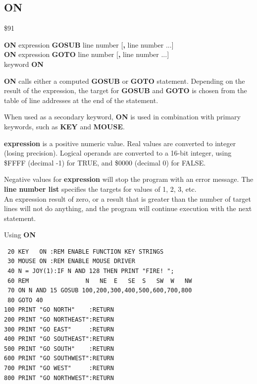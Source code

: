 \subsection{ON}
\begin{description}[leftmargin=2cm,style=nextline]
\item [Token:] \$91
\item [Format:] {\bf ON} expression {\bf GOSUB} line number [{\bf,} line number ...] \\
                {\bf ON} expression {\bf GOTO} line number [{\bf,} line number ...] \\
                keyword {\bf ON}
\item [Usage:]  {\bf ON} calls
                either a computed {\bf GOSUB} or {\bf GOTO} statement.
                Depending on the result of the expression, the target
                for {\bf GOSUB} and {\bf GOTO} is chosen from
                the table of line addresses at the end of the statement.

                When used as a secondary keyword, {\bf ON} is used in
                combination with primary keywords, such as
                {\bf KEY} and  {\bf MOUSE}.

                {\bf expression} is a positive numeric value.
                Real values are converted to integer (losing precision).
                Logical operands are converted to a 16-bit integer,
                using \$FFFF (decimal -1) for TRUE,
                and \$0000 (decimal 0) for FALSE.

\item [Remarks:] Negative values for {\bf expression} will stop
                 the program with an error message.
                 The {\bf line number list} specifies the targets for values
                 of 1, 2, 3, etc. \\
                 An expression result of zero, or a result that is greater
                 than the number of target lines will not do anything, and the
                 program will continue execution with the next statement.

\newpage
\item [Example:] Using {\bf ON}
\begin{tcolorbox}[colback=black,coltext=white]
\verbatimfont{\codefont}
\begin{verbatim}
 20 KEY   ON :REM ENABLE FUNCTION KEY STRINGS
 30 MOUSE ON :REM ENABLE MOUSE DRIVER
 40 N = JOY(1):IF N AND 128 THEN PRINT "FIRE! ";
 60 REM                N   NE  E   SE  S   SW  W   NW
 70 ON N AND 15 GOSUB 100,200,300,400,500,600,700,800
 80 GOTO 40
100 PRINT "GO NORTH"    :RETURN
200 PRINT "GO NORTHEAST":RETURN
300 PRINT "GO EAST"     :RETURN
400 PRINT "GO SOUTHEAST":RETURN
500 PRINT "GO SOUTH"    :RETURN
600 PRINT "GO SOUTHWEST":RETURN
700 PRINT "GO WEST"     :RETURN
800 PRINT "GO NORTHWEST":RETURN
\end{verbatim}
\end{tcolorbox}
\end{description}

